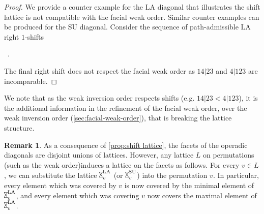 \documentclass{amsart}
\theoremstyle{definition}
\newtheorem{remark}[theorem]{Remark}
\newcommand{\SU}{\mathrm{SU}}
\newcommand{\LA}{\mathrm{LA}}
\newcommand{\hour}{\raisebox{0.065cm}{\rotatebox[origin=c]{90}{$\bowtie$}}_v}
\begin{document}
\begin{proof}
We provide a counter example for the $\LA$ diagonal that illustrates the shift lattice is not compatible with the facial weak order.
Similar counter examples can be produced for the $\SU$ diagonal.
Consider the sequence of path-admissible $\LA$ right $1$-shifts
\begin{center}
 \ .
\end{center}
The final right shift does not respect the facial weak order as $14|23$ and $4|123$ are incomparable.
\end{proof}
We note that as the weak inversion order respects shifts (e.g. $14|23 < 4|123$), it is the additional information in the refinement of the facial weak order, over the weak inversion order (\cref{sec:facial-weak-order}), that is breaking the lattice structure.

\begin{remark}
As a consequence of \cref{prop:shift lattice}, the facets of the operadic diagonals are disjoint unions of lattices.
However, any lattice $L$ on permutations (such as the weak order)induces a lattice on the facets as follows.
For every $v \in L$, we can substitute the lattice $\hour^\LA$ (or $\hour^\SU$) into the permutation $v$.
In particular, every element which was covered by $v$ is now covered by the minimal element of $\hour^\LA$, and every element which was covering $v$ now covers the maximal element of $\hour^\LA$.
\end{remark}
\end{document}
